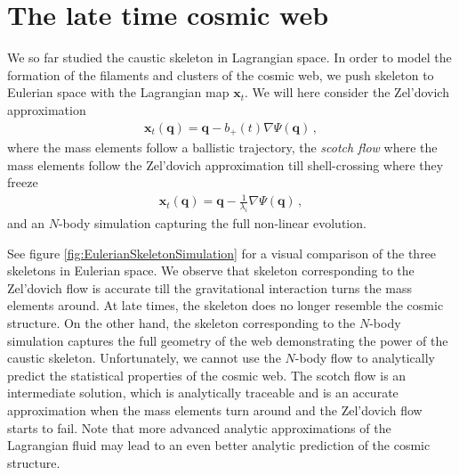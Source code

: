 \documentclass[a4paper, 11pt]{article}
\begin{document}
\section{The late time cosmic web}
We so far studied the caustic skeleton in Lagrangian space. In order to model the formation of the filaments and clusters of the cosmic web, we push skeleton to Eulerian space with the Lagrangian map $\bm{x}_t$. We will here consider the Zel'dovich approximation
\begin{align}
\bm{x}_t(\bm{q}) =\bm{q}-b_+(t)\nabla \Psi(\bm{q})\,,
\end{align}
where the mass elements follow a ballistic trajectory, the \textit{scotch flow} where the mass elements follow the Zel'dovich approximation till shell-crossing where they freeze
\begin{align}
\bm{x}_t(\bm{q})=\bm{q}-\frac{1}{\lambda_i}\nabla\Psi(\bm{q})\,,
\end{align}
and an $N$-body simulation capturing the full non-linear evolution. 

See figure \ref{fig:EulerianSkeletonSimulation} for a visual comparison of the three skeletons in Eulerian space. We observe that skeleton corresponding to the Zel'dovich flow is accurate till the gravitational interaction turns the mass elements around. At late times, the skeleton does no longer resemble the cosmic structure. On the other hand, the skeleton corresponding to the $N$-body simulation captures the full geometry of the web demonstrating the power of the caustic skeleton. Unfortunately, we cannot use the $N$-body flow to analytically predict the statistical properties of the cosmic web. The scotch flow is an intermediate solution, which is analytically traceable and is an accurate approximation when the mass elements turn around and the Zel'dovich flow starts to fail. Note that more advanced analytic approximations of the Lagrangian fluid may lead to an even better analytic prediction of the cosmic structure.
\end{document}
